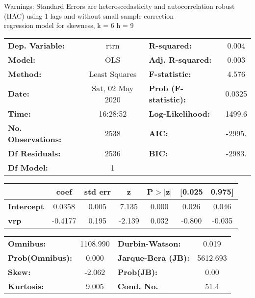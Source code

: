 Warnings: \newline
 [1] Standard Errors are heteroscedasticity and autocorrelation robust (HAC) using 1 lags and without small sample correction\\ 

regression model for skewness, k = 6 h = 9\begin{center}
\begin{tabular}{lclc}
\toprule
\textbf{Dep. Variable:}    &       rtrn       & \textbf{  R-squared:         } &     0.004   \\
\textbf{Model:}            &       OLS        & \textbf{  Adj. R-squared:    } &     0.003   \\
\textbf{Method:}           &  Least Squares   & \textbf{  F-statistic:       } &     4.576   \\
\textbf{Date:}             & Sat, 02 May 2020 & \textbf{  Prob (F-statistic):} &   0.0325    \\
\textbf{Time:}             &     16:28:52     & \textbf{  Log-Likelihood:    } &    1499.6   \\
\textbf{No. Observations:} &        2538      & \textbf{  AIC:               } &    -2995.   \\
\textbf{Df Residuals:}     &        2536      & \textbf{  BIC:               } &    -2983.   \\
\textbf{Df Model:}         &           1      & \textbf{                     } &             \\
\bottomrule
\end{tabular}
\begin{tabular}{lcccccc}
                   & \textbf{coef} & \textbf{std err} & \textbf{z} & \textbf{P$> |$z$|$} & \textbf{[0.025} & \textbf{0.975]}  \\
\midrule
\textbf{Intercept} &       0.0358  &        0.005     &     7.135  &         0.000        &        0.026    &        0.046     \\
\textbf{vrp}       &      -0.4177  &        0.195     &    -2.139  &         0.032        &       -0.800    &       -0.035     \\
\bottomrule
\end{tabular}
\begin{tabular}{lclc}
\textbf{Omnibus:}       & 1108.990 & \textbf{  Durbin-Watson:     } &    0.019  \\
\textbf{Prob(Omnibus):} &   0.000  & \textbf{  Jarque-Bera (JB):  } & 5612.693  \\
\textbf{Skew:}          &  -2.062  & \textbf{  Prob(JB):          } &     0.00  \\
\textbf{Kurtosis:}      &   9.005  & \textbf{  Cond. No.          } &     51.4  \\
\bottomrule
\end{tabular}
\end{center}

